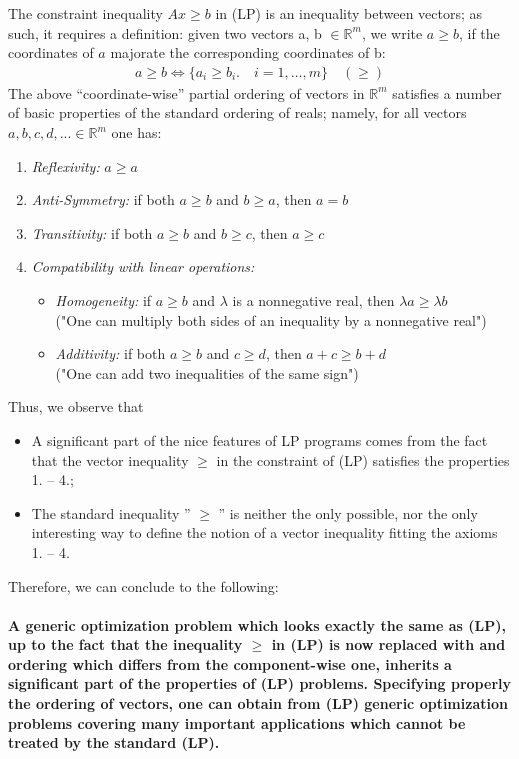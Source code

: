 \documentclass[12pt]{article}
\newcommand{\R}{\mathbb{R}}
\begin{document}
   The constraint inequality $Ax \geq b$ in (LP) is an inequality between vectors; as such, it requires a definition: given two vectors a, b $\in \R^m$, we write $a \geq b$, if the coordinates of $a$ majorate the corresponding coordinates of b:
   \begin{align*}
   a \geq b \Leftrightarrow \{ a_i \geq b_i. \quad i = 1, \ldots, m \} \quad (\geq)
   \end{align*} \newpage
    The above “coordinate-wise” partial ordering of vectors in $\R^m$ satisfies a number of basic properties of the standard ordering of reals; namely, for all vectors $a, b, c, d, ... \in \R^m$ one has:
    \begin{enumerate}
    		\item \textit{Reflexivity:} $a \geq a$
    		\item \textit{Anti-Symmetry:} if both $a \geq b$ and $b \geq a$, then $a = b$
    		\item \textit{Transitivity:} if both $ a\geq b$ and $b \geq c$, then $a \geq c$
    		\item \textit{Compatibility with linear operations:}
    			\begin{itemize}
    				\item \textit{Homogeneity:} if $a \geq b$ and $\lambda$ is a nonnegative real, then $\lambda a \geq \lambda b$ \\ ("One can multiply both sides of an inequality by a nonnegative real")
				\item \textit{Additivity:} if both $a \geq b$ and $c \geq d$, then $a + c \geq b + d$ \\ ("One can add two inequalities of the same sign")
    			\end{itemize}
    \end{enumerate}
   Thus, we observe that
    \begin{itemize}
	\item A significant part of the nice features of LP programs comes from the fact that the vector inequality $\geq$ in the constraint of (LP) satisfies the properties 1. – 4.;
	\item The standard inequality  ” $\geq$ ” is neither the only possible, nor the only interesting way to define the notion of a vector inequality fitting the axioms 1. – 4.
\end{itemize}
Therefore, we can conclude to the following: 
\paragraph*{A generic optimization problem which looks exactly the same as (LP), up to the fact that the inequality $\geq$ in (LP) is now replaced with and ordering which differs from the component-wise one, inherits a significant part of the properties of (LP) problems. Specifying properly the ordering of vectors, one can obtain from (LP) generic optimization problems covering many important applications which cannot be treated by the standard (LP). \newpage} 
\end{document}
